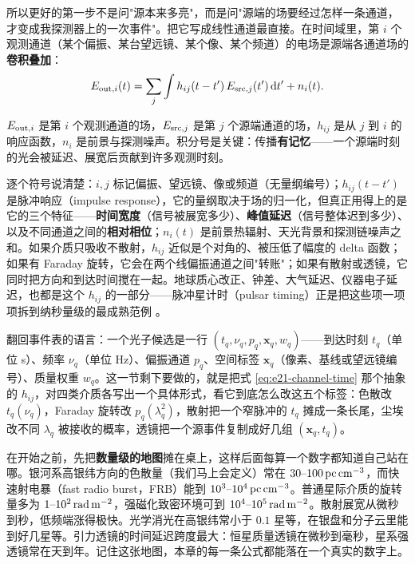 所以更好的第一步不是问"源本来多亮"，而是问"源端的场要经过怎样一条通道，才变成我探测器上的一次事件"。把它写成线性通道最直接。在时间域里，第 \(i\) 个观测通道（某个偏振、某台望远镜、某个像、某个频道）的电场是源端各通道场的\textbf{卷积叠加}：
\begin{equation}
  E_{{\rm out},i}(t)
  =
  \sum_j\int h_{ij}(t-t')\,E_{{\rm src},j}(t')\,{\rm d}t'
  + n_i(t) .
  \label{eq:e21-channel-time}
\end{equation}
\begin{formulaexplain}
\(E_{{\rm out},i}\) 是第 \(i\) 个观测通道的场，\(E_{{\rm src},j}\) 是第 \(j\) 个源端通道的场，\(h_{ij}\) 是从 \(j\) 到 \(i\) 的响应函数，\(n_i\) 是前景与探测噪声。积分号是关键：传播\textbf{有记忆}——一个源端时刻的光会被延迟、展宽后贡献到许多观测时刻。
\end{formulaexplain}
逐个符号说清楚：\(i,j\) 标记偏振、望远镜、像或频道（无量纲编号）；\(h_{ij}(t-t')\) 是脉冲响应（impulse response），它的量纲取决于场的归一化，但真正用得上的是它的三个特征——\textbf{时间宽度}（信号被展宽多少）、\textbf{峰值延迟}（信号整体迟到多少）、以及不同通道之间的\textbf{相对相位}；\(n_i(t)\) 是前景热辐射、天光背景和探测链噪声之和。如果介质只吸收不散射，\(h_{ij}\) 近似是个对角的、被压低了幅度的 delta 函数；如果有 Faraday 旋转，它会在两个线偏振通道之间"转账"；如果有散射或透镜，它同时把方向和到达时间搅在一起。地球质心改正、钟差、大气延迟、仪器电子延迟，也都是这个 \(h_{ij}\) 的一部分——脉冲星计时（pulsar timing）正是把这些项一项项拆到纳秒量级的最成熟范例 \citep{2006MNRAS.372.1549E}。

翻回事件表的语言：一个光子候选是一行 \((t_q,\nu_q,p_q,\bm{x}_q,w_q)\)——到达时刻 \(t_q\)（单位 s）、频率 \(\nu_q\)（单位 Hz）、偏振通道 \(p_q\)、空间标签 \(\bm{x}_q\)（像素、基线或望远镜编号）、质量权重 \(w_q\)。这一节剩下要做的，就是把式 \eqref{eq:e21-channel-time} 那个抽象的 \(h_{ij}\)，对四类介质各写出一个具体形式，看它到底怎么改这五个标签：色散改 \(t_q(\nu_q)\)，Faraday 旋转改 \(p_q(\lambda_q^2)\)，散射把一个窄脉冲的 \(t_q\) 摊成一条长尾，尘埃改不同 \(\lambda_q\) 被接收的概率，透镜把一个源事件复制成好几组 \((\bm{x}_q,t_q)\)。

在开始之前，先把\textbf{数量级的地图}摊在桌上，这样后面每算一个数字都知道自己站在哪。银河系高银纬方向的色散量（我们马上会定义）常在 \(30\text{--}100\,{\rm pc\,cm^{-3}}\)，而快速射电暴（fast radio burst，FRB）能到 \(10^{3}\text{--}10^{4}\,{\rm pc\,cm^{-3}}\)。普通星际介质的旋转量多为 \(1\text{--}10^{2}\,{\rm rad\,m^{-2}}\)，强磁化致密环境可到 \(10^{4}\text{--}10^{5}\,{\rm rad\,m^{-2}}\)。散射展宽从微秒到秒，低频端涨得极快。光学消光在高银纬常小于 \(0.1\) 星等，在银盘和分子云里能到好几星等。引力透镜的时间延迟跨度最大：恒星质量透镜在微秒到毫秒，星系强透镜常在天到年。记住这张地图，本章的每一条公式都能落在一个真实的数字上。

